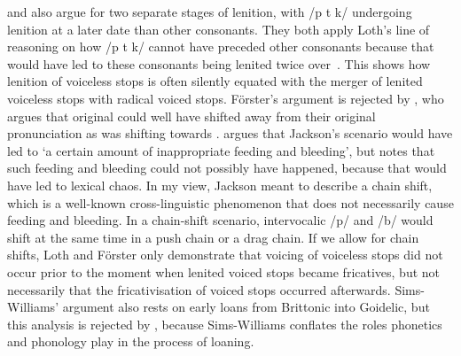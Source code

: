 \Textcite[162]{Foer_Flussname41} and \Textcite{sims-williams_dating_1990} also argue for two separate stages of lenition, with /p t k/ undergoing lenition at a later date than other consonants.
They both apply Loth's line of reasoning on how /p t k/ cannot have preceded other consonants because that would have led to these consonants being lenited twice over~\autocite[\eg][232]{sims-williams_dating_1990}. This shows how  lenition of voiceless stops is often silently equated with the merger of lenited voiceless stops with radical voiced stops. Förster's argument is rejected by \textcite[§~131]{jackson_language_1953}, who argues that original  could well have shifted away from their original pronunciation as  was shifting towards . \Textcite[5]{Tho_Brythonic90} argues that Jackson's scenario would have led to `a certain amount of inappropriate feeding and bleeding', but \textcite[243]{Rus_Introduction95} notes that such feeding and bleeding could not possibly have happened, because that would have led to lexical chaos. In my view, Jackson meant to describe a chain shift, which is a well-known cross-linguistic phenomenon that does not necessarily cause feeding and bleeding. In a chain-shift scenario, intervocalic /p/ and /b/ would shift at the same time in a push chain or a drag chain. If we allow for chain shifts, Loth and Förster only demonstrate that voicing of voiceless stops did not occur prior to the moment when lenited voiced stops became fricatives, but not necessarily that the fricativisation of voiced stops occurred afterwards.  Sims-Williams' argument also rests on early loans from Brittonic into Goidelic, but this analysis is rejected by \textcite{isaac_chronology_2004}, because Sims-Williams conflates the roles  phonetics and phonology play in the process of loaning.

